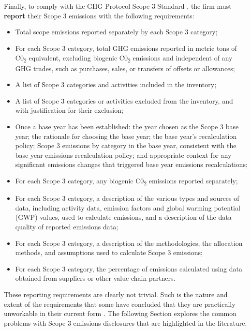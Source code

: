 \documentclass[12pt,twoside]{report}
\begin{document}
\\ \\
Finally, to comply with the GHG Protocol Scope 3 Standard \cite{ghgscope32013}, the firm must \textbf{report} their Scope 3 emissions with the following requirements:
\begin{itemize}
	\item Total scope emissions reported separately by each Scope 3 category;
	\item For each Scope 3 category, total GHG emissions reported in metric tons of C0\textsubscript{2} equivalent, excluding biogenic C0\textsubscript{2} emissions and independent of any GHG trades, such as purchases, sales, or transfers of offsets or allowances;
	\item A list of Scope 3 categories and activities included in the inventory;
	\item A list of Scope 3 categories or activities excluded from the inventory, and with justification for their exclusion;
	\item Once a base year has been established: the year chosen as the Scope 3 base year; the rationale for choosing the base year; the base year's recalculation policy; Scope 3 emissions by category in the base year, consistent with the base year emissions recalculation policy; and appropriate context for any significant emissions changes that triggered base year emissions recalculations;
	\item For each Scope 3 category, any biogenic C0\textsubscript{2} emissions reported separately; 
	\item For each Scope 3 category, a description of the various types and sources of data, including activity data, emission factors and global warming potential (GWP) values, used to calculate emissions, and a description of the data quality of reported emissions data;
	\item For each Scope 3 category, a description of the methodologies, the allocation methods, and assumptions used to calculate Scope 3 emissions;
	\item For each Scope 3 category, the percentage of emissions calculated using data obtained from suppliers or other value chain partners.
\end{itemize}
These reporting requirements are clearly not trivial. Such is the nature and extent of the requirements that some have concluded that they are practically unworkable in their current form \cite{patchell2018}. The following Section explores the common problems with Scope 3 emissions disclosures that are highlighted in the literature.
\end{document}
